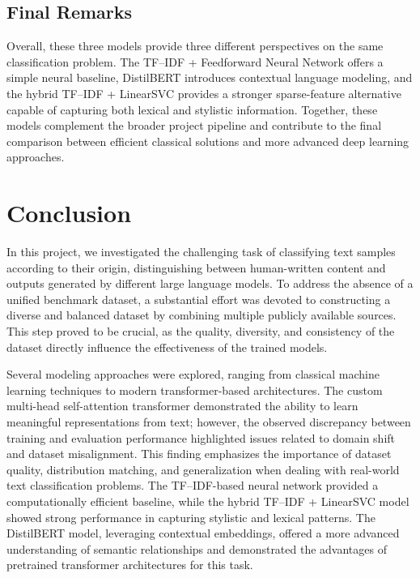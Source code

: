 \documentclass[11pt,a4paper]{article}
\begin{document}
\subsection{Final Remarks}

Overall, these three models provide three different perspectives on the same classification problem. The TF--IDF + Feedforward Neural Network offers a simple neural baseline, DistilBERT introduces contextual language modeling, and the hybrid TF--IDF + LinearSVC provides a stronger sparse-feature alternative capable of capturing both lexical and stylistic information. Together, these models complement the broader project pipeline and contribute to the final comparison between efficient classical solutions and more advanced deep learning approaches.

\section{Conclusion}

In this project, we investigated the challenging task of classifying text samples according to their origin, distinguishing between human-written content and outputs generated by different large language models. To address the absence of a unified benchmark dataset, a substantial effort was devoted to constructing a diverse and balanced dataset by combining multiple publicly available sources. This step proved to be crucial, as the quality, diversity, and consistency of the dataset directly influence the effectiveness of the trained models.

Several modeling approaches were explored, ranging from classical machine learning techniques to modern transformer-based architectures. The custom multi-head self-attention transformer demonstrated the ability to learn meaningful representations from text; however, the observed discrepancy between training and evaluation performance highlighted issues related to domain shift and dataset misalignment. This finding emphasizes the importance of dataset quality, distribution matching, and generalization when dealing with real-world text classification problems. The TF--IDF-based neural network provided a computationally efficient baseline, while the hybrid TF--IDF + LinearSVC model showed strong performance in capturing stylistic and lexical patterns. The DistilBERT model, leveraging contextual embeddings, offered a more advanced understanding of semantic relationships and demonstrated the advantages of pretrained transformer architectures for this task.
\end{document}
